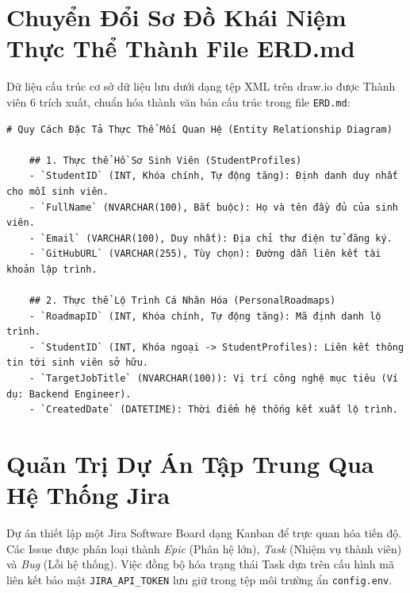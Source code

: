 \section{Chuyển Đổi Sơ Đồ Khái Niệm Thực Thể Thành File ERD.md}
Dữ liệu cấu trúc cơ sở dữ liệu lưu dưới dạng tệp XML trên draw.io được Thành viên 6 trích xuất, chuẩn hóa thành văn bản cấu trúc trong file \texttt{ERD.md}:
\begin{lstlisting}[caption=Nội dung tệp cấu trúc dữ liệu ERD.md]
	# Quy Cách Đặc Tả Thực Thể Mối Quan Hệ (Entity Relationship Diagram)
	
	## 1. Thực thể Hồ Sơ Sinh Viên (StudentProfiles)
	- `StudentID` (INT, Khóa chính, Tự động tăng): Định danh duy nhất cho mỗi sinh viên.
	- `FullName` (NVARCHAR(100), Bắt buộc): Họ và tên đầy đủ của sinh viên.
	- `Email` (VARCHAR(100), Duy nhất): Địa chỉ thư điện tử đăng ký.
	- `GitHubURL` (VARCHAR(255), Tùy chọn): Đường dẫn liên kết tài khoản lập trình.
	
	## 2. Thực thể Lộ Trình Cá Nhân Hóa (PersonalRoadmaps)
	- `RoadmapID` (INT, Khóa chính, Tự động tăng): Mã định danh lộ trình.
	- `StudentID` (INT, Khóa ngoại -> StudentProfiles): Liên kết thông tin tới sinh viên sở hữu.
	- `TargetJobTitle` (NVARCHAR(100)): Vị trí công nghệ mục tiêu (Ví dụ: Backend Engineer).
	- `CreatedDate` (DATETIME): Thời điểm hệ thống kết xuất lộ trình.
\end{lstlisting}

\section{Quản Trị Dự Án Tập Trung Qua Hệ Thống Jira}
Dự án thiết lập một Jira Software Board dạng Kanban để trực quan hóa tiến độ. Các Issue được phân loại thành \textit{Epic} (Phân hệ lớn), \textit{Task} (Nhiệm vụ thành viên) và \textit{Bug} (Lỗi hệ thống). Việc đồng bộ hóa trạng thái Task dựa trên cấu hình mã liên kết bảo mật \texttt{JIRA\_API\_TOKEN} lưu giữ trong tệp môi trường ẩn \texttt{config.env}.